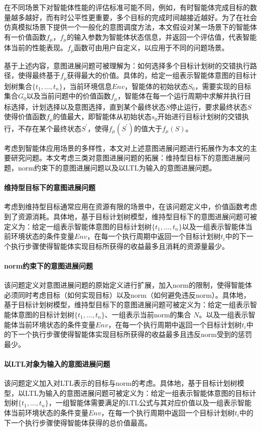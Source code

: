 %
在不同场景下对智能体性能的评估标准可能不同，例如，有时智能体完成目标的数量越多越好，而有时公平性更重要，多个目标的完成时间越接近越好。为了在社会仿真模拟场景下提供一个一般化的意图调度方法，本文假设对某一场景下的智能体有一价值函数$f_{\mu}$，$f_{\mu}$的输入参数为智能体状态信息，并返回一个评估值，代表智能体当前的性能表现。$f_{\mu}$函数可由用户自定义，以应用于不同的问题场景。

基于上述内容，意图进展问题可被理解为：如何选择多个目标计划树的交错执行路径，使得最终基于$f_{\mu}$获得最大的价值。具体的，给定一组表示智能体意图的目标计划树集合$\{t_1, \dots, t_n\}$，当前环境信息$Env$，智能体的初始状态$S_0$，需要实现的目标集合$G_0$以及当前问题中的价值函数$f_{\mu}$，智能体在每一个运行周期中求解并执行目标选择，计划选择以及意图选择，直到某个最终状态$S$停止运行，要求最终状态$S$使得价值函数$f_{\mu}$的值最大，即智能体从初始状态$s_0$开始进行目标计划树的交错执行，不存在某个最终状态$S^{\prime}$，使得$f_{\mu}(S^{\prime})$的值大于$f_{\mu}(S)$。

考虑到智能体应用场景的多样性，本文对上述意图进展问题进行拓展作为本文的主要研究问题。本文考虑三类对意图进展问题的拓展：维持型目标下的意图进展问题，norm约束下的意图进展问题以及以LTL为输入的意图进展问题。

\paragraph{维持型目标下的意图进展问题}
考虑到维持型目标通常应用在资源有限的场景中，在该问题定义中，价值函数考虑到了资源消耗。具体地，基于目标计划树模型，维持型目标下的意图进展问题可被定义为：给定一组表示智能体意图的目标计划树$\{t_1, \dots, t_n\}$以及一组表示智能体当前环境状态的条件变量$Env$，在每一个执行周期中返回一个目标计划树$t_i$中的下一个执行步骤使得智能体实现目标所获得的收益最多且消耗的资源量最少。
\paragraph{norm约束下的意图进展问题}
该问题定义对意图进展问题的原始定义进行扩展，加入norm的限制，使得智能体必须同时考虑目标（如何实现目标）以及norm（如何避免违反norm）。具体地，基于目标计划树模型，维持型目标下的意图进展问题可被定义为：给定一组表示智能体意图的目标计划树$\{t_1, \dots, t_n\}$、一组表示当前norm的集合 $N$。以及一组表示智能体当前环境状态的条件变量$Env$，在每一个执行周期中返回一个目标计划树$t_i$中的下一个执行步骤使得智能体实现目标所获得的收益最多且违反norm受到的惩罚最少。
\paragraph{以LTL对象为输入的意图进展问题}
该问题定义加入对LTL表示的目标与norm的考虑。具体地，基于目标计划树模型，以LTL为输入的意图进展问题可被定义为：给定一组表示智能体意图的目标计划树$\{t_1, \dots, t_n\}$，一组智能体需要满足的LTL公式与其对应价值以及一组表示智能体当前环境状态的条件变量$Env$，在每一个执行周期中返回一个目标计划树$t_i$中的下一个执行步骤使得智能体获得的总价值最高。
